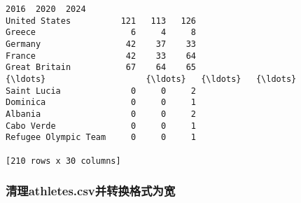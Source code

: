 \documentclass[11pt]{article}
\begin{document}
\begin{Verbatim}[commandchars=\\\{\}]
                      2016  2020  2024
United States          121   113   126
Greece                   6     4     8
Germany                 42    37    33
France                  42    33    64
Great Britain           67    64    65
{\ldots}                    {\ldots}   {\ldots}   {\ldots}
Saint Lucia              0     0     2
Dominica                 0     0     1
Albania                  0     0     2
Cabo Verde               0     0     1
Refugee Olympic Team     0     0     1

[210 rows x 30 columns]
    \end{Verbatim}

    \subsubsection{清理athletes.csv并转换格式为宽}\label{ux6e05ux7406athletes.csvux5e76ux8f6cux6362ux683cux5f0fux4e3aux5bbd}
\end{document}
